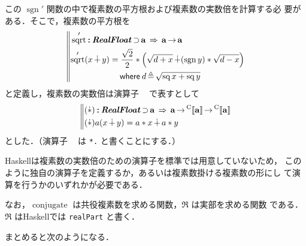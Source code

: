 \documentclass[a5paper,twoside,fleqn,draft]{jsbook}
\def\[{[\![}
\def\]{]\!]}
\DeclareMathOperator{\sgn}{sgn}
\newcommand{\programminglanguage}[1]{\textsf{#1}}
\newcommand{\haskell}{\programminglanguage{Haskell}}
\newcommand{\code}[1]{\texttt{#1}}
\newenvironment{haskellcode}{\begin{itembox}[r]{\haskell}}{\end{itembox}}
\newcommand{\mBrace}{\Vert}
\newcommand{\mKeyword}[1]{\mathsf{#1}}
\newcommand{\mWhereKeyword}{\mKeyword{where}}
\DeclareMathOperator{\mSuperClass}{\;\Rightarrow\;}
\DeclareMathOperator{\mSuperSet}{\supset}
\newcommand{\mSpecialFunc}[1]{\mathrm{#1}}
\DeclareMathOperator{\mConjugate}{\mSpecialFunc{conjugate}}
\DeclareMathOperator{\mSq}{\mSpecialFunc{sq}}
\DeclareMathOperator{\mSqrt}{\mSpecialFunc{sqrt}}
\DeclareMathOperator{\mComplexPlus}{\dotplus}
\DeclareMathOperator{\mComplexTimes}{\Dot\ast}
\DeclareMathOperator{\mFuncArrow}{\rightarrow}
\DeclareMathOperator{\mIn}{{:\!:}}
\DeclareMathOperator{\mLetEq}{\triangleq}
\newcommand{\mType}[1]{\mathbf{#1}} %
\newcommand{\mA}{\mType{a}}
\newcommand{\mTypeAssemble}[2]{{}^\mathrm{#1}\[\mType{#2}\]}
\newcommand{\mCompFunclexType}[1]{\mTypeAssemble{C}{#1}} %
\newcommand{\mTypeClass}[1]{\textbf{\textit{#1}}}
\newcommand{\mRealFloatTypeClass}{\mTypeClass{RealFloat}}
\newcommand{\mProjEXP}[2]{#1\mFuncArrow#2} %
\newcommand{\mWhereIsEXP}[2]{\mathbin{\mWhereKeyword}#1\mLetEq#2} %
\begin{document}
この $\sgn'$ 関数の中で複素数の平方根および複素数の実数倍を計算する必
要がある．そこで，複素数の平方根を
\begin{equation}
  \left\mBrace
  \begin{aligned}
    &\mSqrt'\mIn\mRealFloatTypeClass\mSuperSet\mA
    \mSuperClass\mProjEXP{\mA }{\mA }\\
    &\begin{aligned}
       \mSqrt'(x\mComplexPlus y)
       &=\frac{\sqrt{2}}{2}*\left(\sqrt{d+x}\mComplexPlus(\sgn y)*\sqrt{d-x}\right)\\
       &\quad\mWhereIsEXP{d}{\sqrt{\mSq x+\mSq y}}
     \end{aligned}
  \end{aligned}
  \right.
\end{equation}
と定義し，複素数の実数倍は演算子 $\mComplexTimes$ で表すとして
\begin{equation}
  \left\mBrace
  \begin{aligned}
    &(\mComplexTimes)\mIn\mRealFloatTypeClass\mSuperSet\mA \mSuperClass
    \mProjEXP{\mA }{\mProjEXP{\mCompFunclexType{a}}{\mCompFunclexType{a}}}\\
    &(\mComplexTimes)a(x\mComplexPlus y)=a*x\mComplexPlus a*y
  \end{aligned}
  \right.
\end{equation}
とした．（演算子 $\mComplexTimes$ は \code{*.} と書くことにする．）

\haskell は複素数の実数倍のための演算子を標準では用意していないため，
このように独自の演算子を定義するか，あるいは複素数掛ける複素数の形にし
て演算を行うかのいずれかが必要である．


なお，$\mConjugate$ は共役複素数を求める関数，$\Re$ は実部を求める関数
である．$\Re$ は\haskell では \code{realPart} と書く．

まとめると次のようになる．
\end{document}

